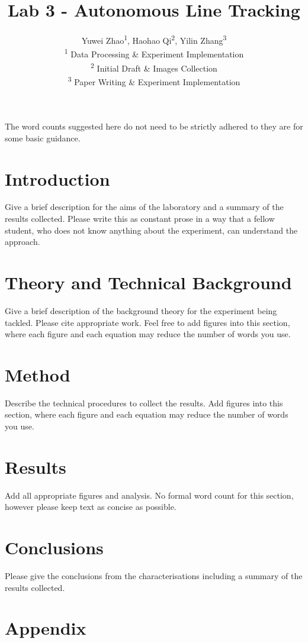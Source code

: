 \documentclass[12pt,a4paper]{article}
\title{
  \textbf{Lab 3 - Autonomous Line Tracking}
}
\author{
  Yuwei Zhao\textsuperscript{1},
  Haohao Qi\textsuperscript{2},
  Yilin Zhang\textsuperscript{3} \\
  \small\textsuperscript{1}
  Data Processing \& Experiment Implementation \\
  \small\textsuperscript{2}
  Initial Draft \& Images Collection \\
  \small\textsuperscript{3}
  Paper Writing \& Experiment Implementation
}
\date{}
\begin{document}
\maketitle

The word counts suggested here do not need to be strictly adhered to they are for some basic guidance.

\section*{Introduction}
Give a brief description for the aims of the laboratory and a summary of the results collected.
Please write this as constant prose in a way that a fellow student,
who does not know anything about the experiment,
can understand the approach.

\section*{Theory and Technical Background}
Give a brief description of the background theory for the experiment being tackled.
Please cite appropriate work.
Feel free to add figures into this section, where
each figure and each equation may reduce the number of words you use.

\section*{Method}
Describe the technical procedures to collect the results.
Add figures into this section, where
each figure and each equation may reduce the number of words you use.

\section*{Results}
Add all appropriate figures and analysis.
No formal word count for this section, however
please keep text as concise as possible.

\section*{Conclusions}
Please give the conclusions from the characterisations including a summary of the results collected.

\appendix
\clearpage

\section{Appendix}

\begin{lstlisting}[language=C++]

\end{lstlisting}
\end{document}
